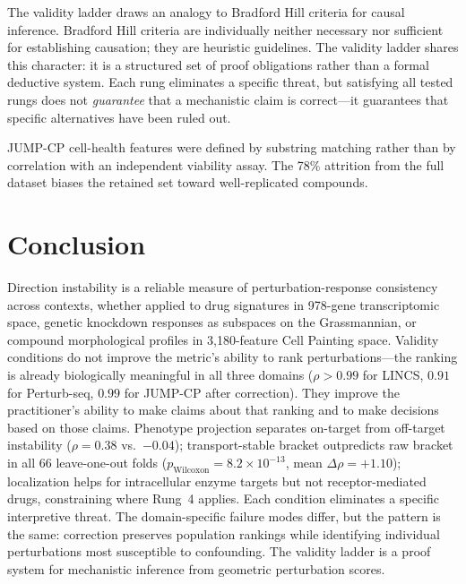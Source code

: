 \documentclass{article}
\begin{document}
The validity ladder draws an analogy to Bradford Hill criteria for causal
inference. Bradford Hill criteria are individually neither necessary nor
sufficient for establishing causation; they are heuristic guidelines. The
validity ladder shares this character: it is a structured set of proof
obligations rather than a formal deductive system. Each rung eliminates
a specific threat, but satisfying all tested rungs does not
\emph{guarantee} that a mechanistic claim is correct---it guarantees
that specific alternatives have been ruled out.

JUMP-CP cell-health features were defined by substring matching rather
than by correlation with an independent viability assay. The 78\% attrition
from the full dataset biases the retained set toward well-replicated
compounds.

\section{Conclusion}

Direction instability is a reliable measure of perturbation-response
consistency across contexts, whether applied to drug signatures in 978-gene
transcriptomic space, genetic knockdown responses as subspaces on the
Grassmannian, or compound morphological profiles in 3{,}180-feature Cell
Painting space. Validity conditions do not improve the metric's ability to
rank perturbations---the ranking is already biologically meaningful in all
three domains ($\rho > 0.99$ for LINCS, $0.91$ for Perturb-seq,
$0.99$ for JUMP-CP after correction). They improve the practitioner's
ability to make claims about that ranking and to make decisions based on
those claims.
Phenotype projection separates on-target from off-target instability
($\rho = 0.38$ vs.\ $-0.04$); transport-stable bracket outpredicts raw
bracket in all 66 leave-one-out folds ($p_{\text{Wilcoxon}} = 8.2 \times
10^{-13}$, mean $\Delta\rho = +1.10$); localization helps for intracellular
enzyme targets but not receptor-mediated drugs, constraining where Rung~4
applies. Each condition eliminates a specific interpretive threat.
The domain-specific failure modes differ, but the pattern is the same:
correction preserves population rankings while identifying individual
perturbations most susceptible to confounding. The validity ladder is a
proof system for mechanistic inference from geometric perturbation scores.



\end{document}
